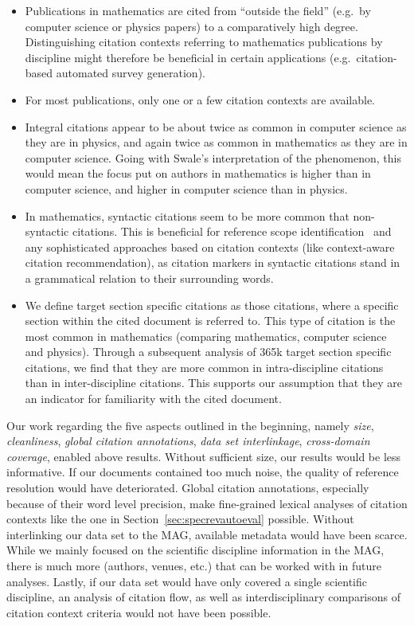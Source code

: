 \begin{itemize}
    \item Publications in mathematics are cited from ``outside the field'' (e.g.\ by computer science or physics papers) to a comparatively high degree. Distinguishing citation contexts referring to mathematics publications by discipline might therefore be beneficial in certain applications (e.g.\ citation-based automated survey generation).
    \item For most publications, only one or a few citation contexts are available.
    \item Integral citations appear to be about twice as common in computer science as they are in physics, and again twice as common in mathematics as they are in computer science. Going with Swale's interpretation of the phenomenon, this would mean the focus put on authors in mathematics is higher than in computer science, and higher in computer science than in physics.
    \item In mathematics, syntactic citations seem to be more common that non-syntactic citations. This is beneficial for reference scope identification~\cite{Abujbara2012} and any sophisticated approaches based on citation contexts (like context-aware citation recommendation), as citation markers in syntactic citations stand in a grammatical relation to their surrounding words.
    \item We define target section specific citations as those citations, where a specific section within the cited document is referred to. This type of citation is the most common in mathematics (comparing mathematics, computer science and physics). Through a subsequent analysis of 365k target section specific citations, we find that they are more common in intra-discipline citations than in inter-discipline citations. This supports our assumption that they are an indicator for familiarity with the cited document.
\end{itemize}

Our work regarding the five aspects outlined in the beginning, namely \emph{size}, \emph{cleanliness}, \emph{global citation annotations}, \emph{data set interlinkage}, \emph{cross-domain coverage}, enabled above results. Without sufficient size, our results would be less informative. If our documents contained too much noise, the quality of reference resolution would have deteriorated. Global citation annotations, especially because of their word level precision, make fine-grained lexical analyses of citation contexts like the one in Section~\ref{sec:specrevautoeval} possible. Without interlinking our data set to the MAG, available metadata would have been scarce. While we mainly focused on the scientific discipline information in the MAG, there is much more (authors, venues, etc.) that can be worked with in future analyses. Lastly, if our data set would have only covered a single scientific discipline, an analysis of citation flow, as well as interdisciplinary comparisons of citation context criteria would not have been possible.


